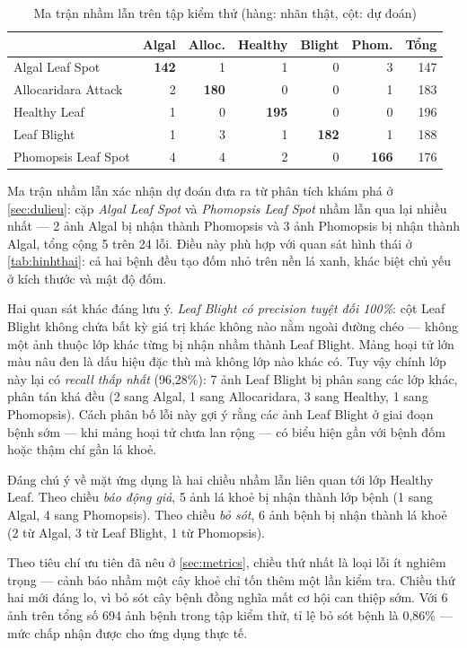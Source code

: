 \begin{table}[H]
\centering
\caption{Ma trận nhầm lẫn trên tập kiểm thử (hàng: nhãn thật, cột: dự đoán)}
\label{tab:confusion}
\small
\begin{tabular}{l r r r r r | r}
\toprule
 & \textbf{Algal} & \textbf{Alloc.} & \textbf{Healthy} & \textbf{Blight} & \textbf{Phom.} & \textbf{Tổng} \\
\midrule
Algal Leaf Spot     & \textbf{142} & 1 & 1 & 0 & 3 & 147 \\
Allocaridara Attack & 2 & \textbf{180} & 0 & 0 & 1 & 183 \\
Healthy Leaf        & 1 & 0 & \textbf{195} & 0 & 0 & 196 \\
Leaf Blight         & 1 & 3 & 1 & \textbf{182} & 1 & 188 \\
Phomopsis Leaf Spot & 4 & 4 & 2 & 0 & \textbf{166} & 176 \\
\bottomrule
\end{tabular}
\end{table}

Ma trận nhầm lẫn xác nhận dự đoán đưa ra từ phân tích khám phá ở
\cref{sec:dulieu}: cặp \emph{Algal Leaf Spot} và \emph{Phomopsis Leaf Spot} nhầm
lẫn qua lại nhiều nhất --- 2 ảnh Algal bị nhận thành Phomopsis và 3 ảnh Phomopsis
bị nhận thành Algal, tổng cộng 5 trên 24 lỗi. Điều này phù hợp với quan sát hình
thái ở \cref{tab:hinhthai}: cả hai bệnh đều tạo đốm nhỏ trên nền lá xanh, khác
biệt chủ yếu ở kích thước và mật độ đốm.

Hai quan sát khác đáng lưu ý. \emph{Leaf Blight có precision tuyệt đối 100\%}:
cột Leaf Blight không chứa bất kỳ giá trị khác không nào nằm ngoài đường chéo ---
không một ảnh thuộc lớp khác từng bị nhận nhầm thành Leaf Blight. Mảng hoại tử lớn
màu nâu đen là dấu hiệu đặc thù mà không lớp nào khác có. Tuy vậy chính lớp này
lại có \emph{recall thấp nhất} (96,28\%): 7 ảnh Leaf Blight bị phân sang các lớp
khác, phân tán khá đều (2 sang Algal, 1 sang Allocaridara, 3 sang Healthy, 1 sang
Phomopsis). Cách phân bố lỗi này gợi ý rằng các ảnh Leaf Blight ở giai đoạn bệnh
sớm --- khi mảng hoại tử chưa lan rộng --- có biểu hiện gần với bệnh đốm hoặc thậm
chí gần lá khoẻ.

Đáng chú ý về mặt ứng dụng là hai chiều nhầm lẫn liên quan tới lớp Healthy Leaf.
Theo chiều \emph{báo động giả}, 5 ảnh lá khoẻ bị nhận thành lớp bệnh (1 sang Algal,
4 sang Phomopsis). Theo chiều \emph{bỏ sót}, 6 ảnh bệnh bị nhận thành lá khoẻ (2
từ Algal, 3 từ Leaf Blight, 1 từ Phomopsis).

Theo tiêu chí ưu tiên  đã nêu ở \cref{sec:metrics}, chiều thứ nhất là
loại lỗi ít nghiêm trọng --- cảnh báo nhầm một cây khoẻ chỉ tốn thêm một lần kiểm
tra. Chiều thứ hai mới đáng lo, vì bỏ sót cây bệnh đồng nghĩa mất cơ hội can thiệp
sớm. Với 6 ảnh trên tổng số 694 ảnh bệnh trong tập kiểm thử, tỉ lệ bỏ sót bệnh là
0,86\% --- mức chấp nhận được cho ứng dụng thực tế.

